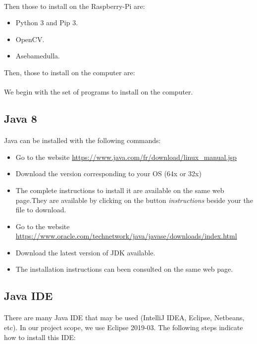 \documentclass[12pt]{report}
\begin{document}
\paragraph{}
Then those to install on the Raspberry-Pi are:
\begin{itemize}
	\item Python 3 and Pip 3.
    \item OpenCV.
    \item Asebamedulla.
\end{itemize}
Then, those to install on the computer are:

\paragraph{}
We begin with the set of programs to install on the computer. 
\subsection{Java 8}
\paragraph{}
Java can be installed with the following commands:

\begin{itemize}
	\item Go to the website \url{https://www.java.com/fr/download/linux_manual.jsp}
	\item Download the version corresponding to your OS (64x or 32x)
	\item The complete instructions to install it are available on the same web page.They are available by clicking on the button \emph{instructions} beside your the file to download.
	\item Go to the website \url{https://www.oracle.com/technetwork/java/javase/downloads/index.html}
	\item Download the latest version of JDK available.
	\item The installation instructions can been consulted on the same web page.
\end{itemize}


\subsection{Java IDE}
\paragraph{}
There are many Java IDE that may be used (IntelliJ IDEA, Eclipse, Netbeans, etc). In our project scope, we use Eclipse 2019-03. The following steps indicate how to install this IDE: 
\end{document}
